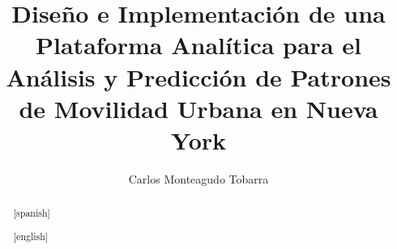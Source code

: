 \documentclass[11pt,spanish,listoffigures,listoftables]{99.Configuracion/conf}
\title{Diseño e Implementación de una Plataforma
Analítica para el Análisis y Predicción de Patrones
de Movilidad Urbana en Nueva York}
\author{Carlos Monteagudo Tobarra}
\begin{document}


\begin{abstract}

\end{abstract}
\clearpage

\begin{abstract}[spanish]

\end{abstract}
\clearpage

\begin{abstract}[english]

\end{abstract}
\clearpage

\mainmatter%












\backmatter%



\end{document}
